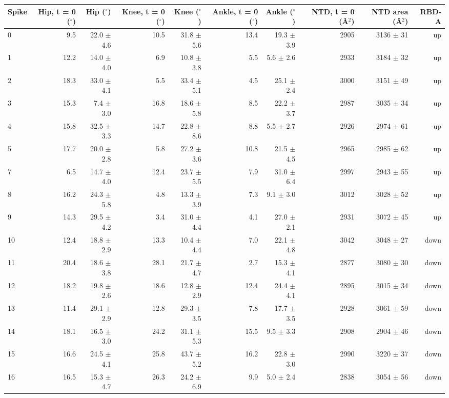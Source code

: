 \begin{tabular}{lrrrrrrrrr}
\toprule
Spike & Hip, t = 0 ($^\circ$) & Hip ($^\circ$) & Knee, t = 0 ($^\circ$) & Knee ($^\circ$) & Ankle, t = 0 ($^\circ$) & Ankle ($^\circ$) & NTD, t = 0 (\AA$^2$) & NTD area (\AA$^2$) & RBD-A \\
\midrule
0 & 9.5 & 22.0 $\pm$ 4.6 & 10.5 & 31.8 $\pm$ 5.6 & 13.4 & 19.3 $\pm$ 3.9 & 2905 & 3136 $\pm$ 31 & up \\
1 & 12.2 & 14.0 $\pm$ 4.0 & 6.9 & 10.8 $\pm$ 3.8 & 5.5 & 5.6 $\pm$ 2.6 & 2933 & 3184 $\pm$ 32 & up \\
2 & 18.3 & 33.0 $\pm$ 4.1 & 5.5 & 33.4 $\pm$ 5.1 & 4.5 & 25.1 $\pm$ 2.4 & 3000 & 3151 $\pm$ 49 & up \\
3 & 15.3 & 7.4 $\pm$ 3.0 & 16.8 & 18.6 $\pm$ 5.8 & 8.5 & 22.2 $\pm$ 3.7 & 2987 & 3035 $\pm$ 34 & up \\
4 & 15.8 & 32.5 $\pm$ 3.3 & 14.7 & 22.8 $\pm$ 8.6 & 8.8 & 5.5 $\pm$ 2.7 & 2926 & 2974 $\pm$ 61 & up \\
5 & 17.7 & 20.0 $\pm$ 2.8 & 5.8 & 27.2 $\pm$ 3.6 & 10.8 & 21.5 $\pm$ 4.5 & 2965 & 2985 $\pm$ 62 & up \\
7 & 6.5 & 14.7 $\pm$ 4.0 & 12.4 & 23.7 $\pm$ 5.5 & 7.9 & 31.0 $\pm$ 6.4 & 2997 & 2943 $\pm$ 55 & up \\
8 & 16.2 & 24.3 $\pm$ 5.8 & 4.8 & 13.3 $\pm$ 3.9 & 7.3 & 9.1 $\pm$ 3.0 & 3012 & 3028 $\pm$ 52 & up \\
9 & 14.3 & 29.5 $\pm$ 4.2 & 3.4 & 31.0 $\pm$ 4.4 & 4.1 & 27.0 $\pm$ 2.1 & 2931 & 3072 $\pm$ 45 & up \\
10 & 12.4 & 18.8 $\pm$ 2.9 & 13.3 & 10.4 $\pm$ 4.4 & 7.0 & 22.1 $\pm$ 4.8 & 3042 & 3048 $\pm$ 27 & down \\
11 & 20.4 & 18.6 $\pm$ 3.8 & 28.1 & 21.7 $\pm$ 4.7 & 2.7 & 15.3 $\pm$ 4.1 & 2877 & 3080 $\pm$ 30 & down \\
12 & 18.2 & 19.8 $\pm$ 2.6 & 18.6 & 12.8 $\pm$ 2.9 & 12.4 & 24.4 $\pm$ 4.1 & 2895 & 3015 $\pm$ 34 & down \\
13 & 11.4 & 29.1 $\pm$ 2.9 & 12.8 & 29.3 $\pm$ 3.5 & 7.8 & 17.7 $\pm$ 3.5 & 2928 & 3061 $\pm$ 59 & down \\
14 & 18.1 & 16.5 $\pm$ 3.0 & 24.2 & 31.1 $\pm$ 5.3 & 15.5 & 9.5 $\pm$ 3.3 & 2908 & 2904 $\pm$ 46 & down \\
15 & 16.6 & 24.5 $\pm$ 4.1 & 25.8 & 43.7 $\pm$ 5.2 & 16.2 & 22.8 $\pm$ 3.0 & 2990 & 3220 $\pm$ 37 & down \\
16 & 16.5 & 15.3 $\pm$ 4.7 & 26.3 & 24.2 $\pm$ 6.9 & 9.9 & 5.0 $\pm$ 2.4 & 2838 & 3054 $\pm$ 56 & down \\

\end{tabular}
